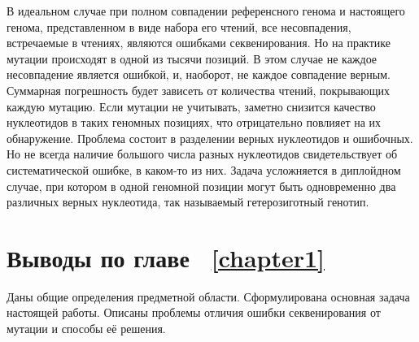 В идеальном случае при полном совпадении референсного генома и настоящего генома, представленном в виде набора его чтений, все несовпадения, встречаемые в чтениях, являются ошибками секвенирования. Но на практике мутации происходят в одной из тысячи позиций. В этом случае не каждое несовпадение является ошибкой, и, наоборот, не каждое совпадение верным. Суммарная погрешность будет зависеть от количества чтений, покрывающих каждую мутацию. Если мутации не учитывать, заметно снизится качество нуклеотидов в таких геномных позициях, что отрицательно повлияет на их обнаружение. Проблема состоит в разделении верных нуклеотидов и ошибочных. Но не всегда наличие большого числа разных нуклеотидов свидетельствует об систематической ошибке, в каком-то из них. Задача усложняется в диплойдном случае, при котором в одной геномной позиции могут быть одновременно два различных верных нуклеотида, так называемый гетерозиготный генотип.


\section{Выводы по главе \protect~\ref{chapter1}}
\label{summary_1}
	Даны общие определения предметной области. Сформулирована основная задача настоящей работы. Описаны проблемы отличия ошибки секвенирования от мутации и способы её решения.